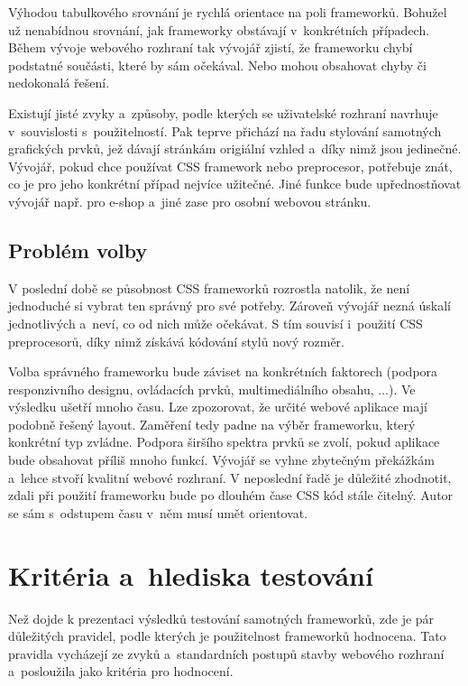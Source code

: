 \documentclass[thesis=B,czech]{FITthesis}[2012/06/26]
\begin{document}
Výhodou tabulkového srovnání je rychlá orientace na poli frameworků. Bohužel už nenabídnou srovnání, jak frameworky obstávají v~konkrétních případech. Během vývoje webového rozhraní tak vývojář zjistí, že frameworku chybí podstatné součásti, které by sám očekával. Nebo mohou obsahovat chyby či nedokonalá řešení. 

Existují jisté zvyky a~způsoby, podle kterých se uživatelské rozhraní navrhuje v~souvislosti s~použitelností. Pak teprve přichází na řadu stylování samotných grafických prvků, jež dávají stránkám origiální vzhled a~díky nimž jsou jedinečné. Vývojář, pokud chce používat \gls{CSS} framework nebo preprocesor, potřebuje znát, co je pro jeho konkrétní případ nejvíce užitečné. Jiné funkce bude upřednostňovat vývojář např. pro e-shop a~jiné zase pro osobní webovou stránku.


\section{Problém volby}

V poslední době se působnost \gls{CSS} frameworků rozrostla natolik, že není jednoduché si vybrat ten správný pro své potřeby. Zároveň vývojář nezná úskalí jednotlivých a~neví, co od nich může očekávat. S tím souvisí i~použití \gls{CSS} preprocesorů, díky nimž získává kódování stylů nový rozměr. 

Volba správného frameworku bude záviset na konkrétních faktorech (podpora responzivního designu, ovládacích prvků, multimediálního obsahu, ...). Ve výsledku ušetří mnoho času. Lze zpozorovat, že určité webové aplikace mají podobně řešený layout. Zaměření tedy padne na výběr frameworku, který konkrétní typ zvládne. Podpora širšího spektra prvků se zvolí, pokud aplikace bude obsahovat příliš mnoho funkcí. Vývojář se vyhne zbytečným překážkám a~lehce stvoří kvalitní webové rozhraní. V neposlední řadě je důležité zhodnotit, zdali při použití frameworku bude po dlouhém čase \gls{CSS} kód stále čitelný. Autor se sám s~odstupem času v~něm musí umět orientovat.



\chapter{Kritéria a~hlediska testování}
\label{sec:hod}
Než dojde k prezentaci výsledků testování samotných frameworků, zde je pár důležitých pravidel, podle kterých je použitelnost frameworků hodnocena. Tato pravidla vycházejí ze zvyků a~standardních postupů stavby webového rozhraní a~posloužila jako kritéria pro hodnocení.
\end{document}
